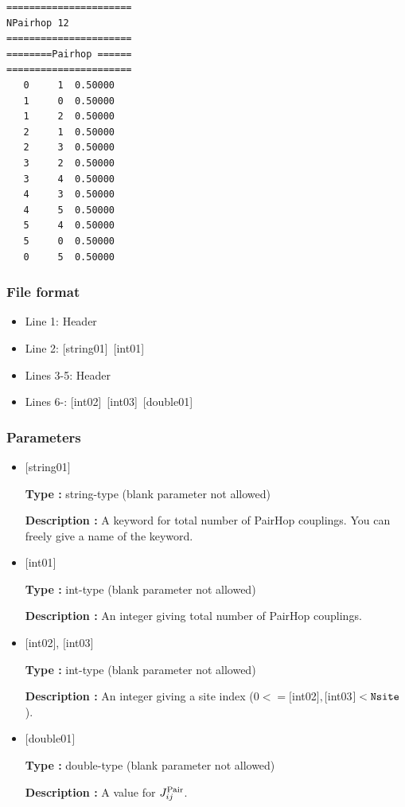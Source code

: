 \begin{minipage}{12.5cm}
\begin{screen}
\begin{verbatim}
====================== 
NPairhop 12  
====================== 
========Pairhop ====== 
====================== 
   0     1  0.50000
   1     0  0.50000  
   1     2  0.50000
   2     1  0.50000
   2     3  0.50000
   3     2  0.50000
   3     4  0.50000
   4     3  0.50000
   4     5  0.50000
   5     4  0.50000
   5     0  0.50000
   0     5  0.50000
\end{verbatim}
\end{screen}
\end{minipage}

\subsubsection{File format}
 \begin{itemize}
   \item  Line 1:  Header
   \item  Line 2:   [string01]~[int01]
   \item  Lines 3-5:  Header
   \item  Lines 6-: 
   [int02]~[int03]~[double01] 
  \end{itemize}
\subsubsection{Parameters}
 \begin{itemize}

   \item  $[$string01$]$
   
    {\bf Type :} string-type (blank parameter not allowed)

   {\bf Description :} A keyword for total number of PairHop couplings. You can freely give a name of the keyword.

   \item  $[$int01$]$
   
    {\bf Type :} int-type (blank parameter not allowed)

   {\bf Description :}  An integer giving total number of PairHop couplings.

  \item  $[$int02$]$, $[$int03$]$
  
 {\bf Type :} int-type (blank parameter not allowed)

{\bf Description :} An integer giving a site index ($0<= [$int02$], [$int03$]<\verb|Nsite|$).
 
 \item  $[$double01$]$
   
   {\bf Type :} double-type (blank parameter not allowed)

  {\bf Description :}   A value for $J_{ij}^{\rm Pair}$.
  
\end{itemize}


